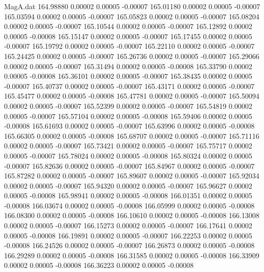 \begin{filecontents}{MagA.dat}
 164.98880    0.00002    0.00005   -0.00007
 165.01180    0.00002    0.00005   -0.00007
 165.03594    0.00002    0.00005   -0.00007
 165.05823    0.00002    0.00005   -0.00007
 165.08204    0.00002    0.00005   -0.00007
 165.10544    0.00002    0.00005   -0.00007
 165.12892    0.00002    0.00005   -0.00008
 165.15147    0.00002    0.00005   -0.00007
 165.17455    0.00002    0.00005   -0.00007
 165.19792    0.00002    0.00005   -0.00007
 165.22110    0.00002    0.00005   -0.00007
 165.24425    0.00002    0.00005   -0.00007
 165.26736    0.00002    0.00005   -0.00007
 165.29066    0.00002    0.00005   -0.00007
 165.31494    0.00002    0.00005   -0.00008
 165.33790    0.00002    0.00005   -0.00008
 165.36101    0.00002    0.00005   -0.00007
 165.38435    0.00002    0.00005   -0.00007
 165.40737    0.00002    0.00005   -0.00007
 165.43171    0.00002    0.00005   -0.00007
 165.45477    0.00002    0.00005   -0.00008
 165.47781    0.00002    0.00005   -0.00007
 165.50094    0.00002    0.00005   -0.00007
 165.52399    0.00002    0.00005   -0.00007
 165.54819    0.00002    0.00005   -0.00007
 165.57104    0.00002    0.00005   -0.00008
 165.59406    0.00002    0.00005   -0.00008
 165.61693    0.00002    0.00005   -0.00007
 165.63996    0.00002    0.00005   -0.00008
 165.66305    0.00002    0.00005   -0.00008
 165.68707    0.00002    0.00005   -0.00007
 165.71116    0.00002    0.00005   -0.00007
 165.73421    0.00002    0.00005   -0.00007
 165.75717    0.00002    0.00005   -0.00007
 165.78024    0.00002    0.00005   -0.00008
 165.80324    0.00002    0.00005   -0.00007
 165.82636    0.00002    0.00005   -0.00007
 165.84967    0.00002    0.00005   -0.00007
 165.87282    0.00002    0.00005   -0.00007
 165.89607    0.00002    0.00005   -0.00007
 165.92034    0.00002    0.00005   -0.00007
 165.94320    0.00002    0.00005   -0.00007
 165.96627    0.00002    0.00005   -0.00008
 165.98941    0.00002    0.00005   -0.00008
 166.01351    0.00002    0.00005   -0.00008
 166.03674    0.00002    0.00005   -0.00008
 166.05999    0.00002    0.00005   -0.00008
 166.08300    0.00002    0.00005   -0.00008
 166.10610    0.00002    0.00005   -0.00008
 166.13008    0.00002    0.00005   -0.00007
 166.15273    0.00002    0.00005   -0.00007
 166.17641    0.00002    0.00005   -0.00008
 166.19891    0.00002    0.00005   -0.00007
 166.22253    0.00002    0.00005   -0.00008
 166.24526    0.00002    0.00005   -0.00007
 166.26873    0.00002    0.00005   -0.00008
 166.29289    0.00002    0.00005   -0.00008
 166.31585    0.00002    0.00005   -0.00008
 166.33909    0.00002    0.00005   -0.00008
 166.36223    0.00002    0.00005   -0.00008

\end{filecontents}
